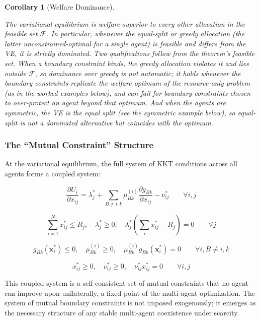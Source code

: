 \documentclass[11pt]{article}
\theoremstyle{plain}
\newtheorem{corollary}[theorem]{Corollary}
\theoremstyle{definition}
\theoremstyle{remark}
\let\origsubsubsection\subsubsection
\renewcommand{\subsubsection}{\needspace{4\baselineskip}\origsubsubsection}
\begin{document}
\begin{corollary}[Welfare Dominance]
\label{cor-welfare-dominance}

The variational equilibrium is welfare-superior to every other allocation in the feasible set $\mathcal{F}$. In particular, whenever the equal-split or greedy allocation (the latter unconstrained-optimal for a single agent) is feasible and differs from the VE, it is strictly dominated. Two qualifications follow from the theorem's feasible set. When a boundary constraint binds, the greedy allocation violates it and lies outside $\mathcal{F}$, so dominance over greedy is not automatic; it holds whenever the boundary constraints replicate the welfare optimum of the resource-only problem (as in the worked examples below), and can fail for boundary constraints chosen to over-protect an agent beyond that optimum. And when the agents are symmetric, the VE \emph{is} the equal split (see the symmetric example below), so equal-split is not a dominated alternative but coincides with the optimum.
\end{corollary}

\subsubsection{The ``Mutual Constraint''
Structure}\label{the-mutual-constraint-structure}

At the variational equilibrium, the full system of KKT conditions across
all agents forms a coupled system:

\[\frac{\partial U_i}{\partial x_{ij}} = \lambda_j^* + \sum_{B \neq i, k} \mu_{Bk}^{(i)} \frac{\partial g_{Bk}}{\partial x_{ij}} - \nu_{ij}^* \qquad \forall i, j\]

\[\sum_{i=1}^{N} x_{ij}^* \leq R_j, \quad \lambda_j^* \geq 0, \quad \lambda_j^*\left(\sum_i x_{ij}^* - R_j\right) = 0 \qquad \forall j\]

\[g_{Bk}(\mathbf{x}_i^*) \leq 0, \quad \mu_{Bk}^{(i)} \geq 0, \quad \mu_{Bk}^{(i)} g_{Bk}(\mathbf{x}_i^*) = 0 \qquad \forall i, B \neq i, k\]

\[x_{ij}^* \geq 0, \quad \nu_{ij}^* \geq 0, \quad \nu_{ij}^* x_{ij}^* = 0 \qquad \forall i, j\]

This coupled system is a self-consistent set of mutual constraints that
no agent can improve upon unilaterally, a fixed point of the multi-agent
optimization. The system of mutual boundary constraints is not imposed
exogenously; it emerges as the necessary structure of any stable
multi-agent coexistence under scarcity.
\end{document}
